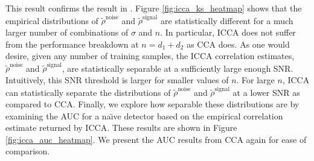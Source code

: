 This result confirms the result in \cite{nadakuditi2011fundamental}. Figure
\ref{fig:icca_ks_heatmap} shows that the empirical distributions of
$\widetilde{\rho}^{\text{noise}}$ and $\widetilde{\rho}^{\text{signal}}$ are statistically
different for a much larger number of combinations of $\sigma$ and $n$. In particular,
ICCA does not suffer from the performance breakdown at $n=d_1+d_2$ as CCA does. As one
would desire, given any number of training samples, the ICCA correlation estimates,
$\widetilde{\rho}^{\text{noise}}$ and $\widetilde{\rho}^{\text{signal}}$, are
statistically separable at a sufficiently large enough SNR. Intuitively, this SNR
threshold is larger for smaller values of $n$. For large $n$, ICCA can statistically
separate the distributions of $\widetilde{\rho}^{\text{noise}}$ and
$\widetilde{\rho}^{\text{signal}}$ at a lower SNR as compared to CCA. Finally, we explore
how separable these distributions are by examining the AUC for a na\"{\i}ve detector based
on the empirical correlation estimate returned by ICCA. These results are shown in Figure
\ref{fig:icca_auc_heatmap}. We present the AUC results from CCA again for ease of
comparison.

